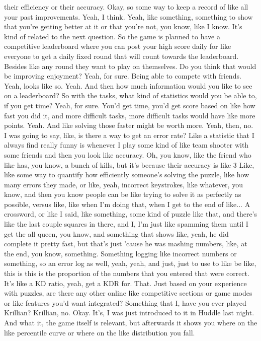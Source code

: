 \documentclass{article}
\begin{document}
their efficiency or their accuracy.
Okay, so some way to keep a record of like all your past improvements. Yeah, I think. Yeah, like something, something to show that you're getting better at it or that you're not, you know, like I know.
It's kind of related to the next question. So the game is planned to have a competitive leaderboard where you can post your high score daily for like everyone to get a daily fixed round that will count towards the leaderboard. Besides like any round they want to play on themselves. Do you think that would be improving enjoyment?
Yeah, for sure. Being able to compete with friends. Yeah, looks like so.
Yeah.
And then how much information would you like to see on a leaderboard?
So with the tasks, what kind of statistics would you be able to, if you get time? Yeah, for sure. You'd get time, you'd get score based on like how fast you did it, and more difficult tasks, more difficult tasks would have like more points. Yeah. And like solving those faster might be worth more.
Yeah, then, no.
I was going to say, like, is there a way to get an error rate? Like a statistic that I always find really funny is whenever I play some kind of like team shooter with some friends and then you look like accuracy. Oh, you know, like the friend who like has, you know, a bunch of kills, but it's because their accuracy is like 3%
Like, like some way to quantify how efficiently someone's solving the puzzle, like how many errors they made, or like, yeah, incorrect keystrokes, like whatever, you know, and then you know people can be like trying to solve it as perfectly as possible, versus like, like when I'm doing that, when I get to the end of like...
A crossword, or like I said, like something, some kind of puzzle like that, and there's like the last couple squares in there, and I, I'm just like spamming them until I get the all queen, you know, and something that shows like, yeah, he did complete it pretty fast, but that's just 'cause he was mashing numbers, like, at the end, you know, something.
Something logging like incorrect numbers or something, so an error log as well, yeah, yeah, and just, just to use to like be like, this is this is the proportion of the numbers that you entered that were correct. It's like a KD ratio, yeah, get a KDR for.
That.
Just based on your experience with puzzles, are there any other online like competitive sections or game modes or like features you'd want integrated?
Something that I, have you ever played Krillian? Krillian, no. Okay. It's, I was just introduced to it in Huddle last night. And what it, the game itself is relevant, but afterwards it shows you where on the like percentile curve or where on the like distribution you fall.
\end{document}
